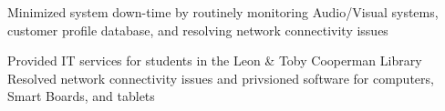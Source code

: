 \documentclass[a4paper]{Resume}
\begin{document}
\begin{onehalfspace}
\pt Minimized system down-time by routinely monitoring Audio/Visual systems, customer profile database, and resolving network connectivity issues \\



\sectionsep



\pt Provided IT services for students in the Leon \& Toby Cooperman Library \\

\pt Resolved network connectivity issues and privsioned software for computers, Smart Boards, and tablets \\
\sectionsep

\end{onehalfspace}

\end{document}
